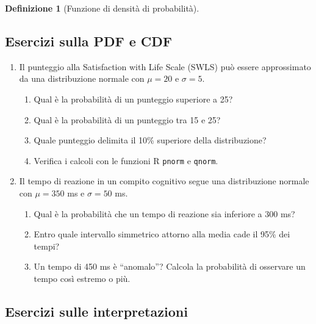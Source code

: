 \documentclass[
  italian,
  letterpaper,
  a4paper,
  11pt,
  open=any]{scrbook}
\providecommand{\tightlist}{%
  \setlength{\itemsep}{0pt}\setlength{\parskip}{0pt}}
\theoremstyle{plain}
\theoremstyle{definition}
\theoremstyle{definition}
\newtheorem{definition}{Definizione}[chapter]
\theoremstyle{remark}
\begin{document}
\begin{definition}[Funzione di densità di
probabilità]
\begin{tcolorbox}
\subsection*{Esercizi sulla PDF e CDF}\label{esercizi-sulla-pdf-e-cdf}

\begin{enumerate}
\def\labelenumi{\arabic{enumi}.}
\setcounter{enumi}{5}
\item
  Il punteggio alla Satisfaction with Life Scale (SWLS) può essere
  approssimato da una distribuzione normale con \(\mu = 20\) e
  \(\sigma = 5\).

  \begin{enumerate}
  \def\labelenumii{\alph{enumii}.}
  \tightlist
  \item
    Qual è la probabilità di un punteggio superiore a 25?
  \item
    Qual è la probabilità di un punteggio tra 15 e 25?
  \item
    Quale punteggio delimita il 10\% superiore della distribuzione?
  \item
    Verifica i calcoli con le funzioni R \texttt{pnorm} e
    \texttt{qnorm}.
  \end{enumerate}
\item
  Il tempo di reazione in un compito cognitivo segue una distribuzione
  normale con \(\mu = 350\) ms e \(\sigma = 50\) ms.

  \begin{enumerate}
  \def\labelenumii{\alph{enumii}.}
  \tightlist
  \item
    Qual è la probabilità che un tempo di reazione sia inferiore a 300
    ms?
  \item
    Entro quale intervallo simmetrico attorno alla media cade il 95\%
    dei tempi?
  \item
    Un tempo di 450 ms è ``anomalo''? Calcola la probabilità di
    osservare un tempo così estremo o più.
  \end{enumerate}
\end{enumerate}

\subsection*{Esercizi sulle
interpretazioni}\label{esercizi-sulle-interpretazioni}


\end{tcolorbox}
\end{definition}
\end{document}
